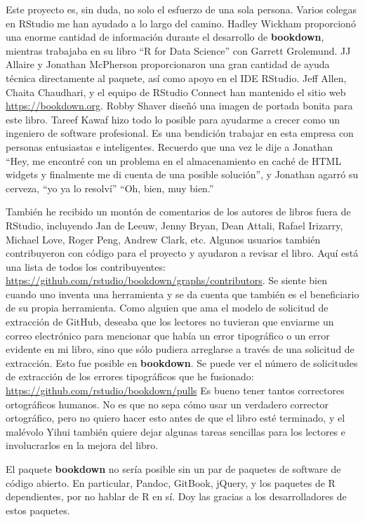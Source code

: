 \documentclass[12pt,]{krantz}
\theoremstyle{definition}
\theoremstyle{definition}
\theoremstyle{remark}
\begin{document}
Este proyecto es, sin duda, no solo el esfuerzo de una sola persona.
Varios colegas en RStudio me han ayudado a lo largo del camino. Hadley
Wickham proporcionó una enorme cantidad de información durante el
desarrollo de \textbf{bookdown}, mientras trabajaba en su libro ``R for
Data Science'' con Garrett Grolemund. JJ Allaire y Jonathan McPherson
proporcionaron una gran cantidad de ayuda técnica directamente al
paquete, así como apoyo en el IDE RStudio. Jeff Allen, Chaita Chaudhari,
y el equipo de RStudio Connect han mantenido el sitio web
\url{https://bookdown.org}. Robby Shaver diseñó una imagen de portada
bonita para este libro. Tareef Kawaf hizo todo lo posible para ayudarme
a crecer como un ingeniero de software profesional. Es una bendición
trabajar en esta empresa con personas entusiastas e inteligentes.
Recuerdo que una vez le dije a Jonathan ``Hey, me encontré con un
problema en el almacenamiento en caché de HTML widgets y finalmente me
di cuenta de una posible solución'', y Jonathan agarró su cerveza, ``yo
ya lo resolví'' ``Oh, bien, muy bien.''

También he recibido un montón de comentarios de los autores de libros
fuera de RStudio, incluyendo Jan de Leeuw, Jenny Bryan, Dean Attali,
Rafael Irizarry, Michael Love, Roger Peng, Andrew Clark, etc. Algunos
usuarios también contribuyeron con código para el proyecto y ayudaron a
revisar el libro. Aquí está una lista de todos los contribuyentes:
\url{https://github.com/rstudio/bookdown/graphs/contributors}. Se siente
bien cuando uno inventa una herramienta y se da cuenta que también es el
beneficiario de su propia herramienta. Como alguien que ama el modelo de
solicitud de extracción de GitHub, deseaba que los lectores no tuvieran
que enviarme un correo electrónico para mencionar que había un error
tipográfico o un error evidente en mi libro, sino que sólo pudiera
arreglarse a través de una solicitud de extracción. Esto fue posible en
\textbf{bookdown}. Se puede ver el número de solicitudes de extracción
de los errores tipográficos que he fusionado:
\url{https://github.com/rstudio/bookdown/pulls} Es bueno tener tantos
correctores ortográficos humanos. No es que no sepa cómo usar un
verdadero corrector ortográfico, pero no quiero hacer esto antes de que
el libro esté terminado, y el malévolo Yihui también quiere dejar
algunas tareas sencillas para los lectores e involucrarlos en la mejora
del libro.

El paquete \textbf{bookdown} no sería posible sin un par de paquetes de
software de código abierto. En particular, Pandoc, GitBook, jQuery, y
los paquetes de R dependientes, por no hablar de R en sí. Doy las
gracias a los desarrolladores de estos paquetes.
\end{document}
